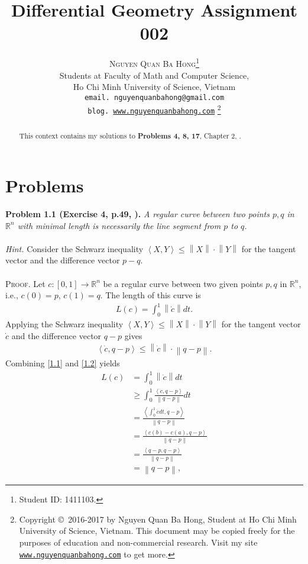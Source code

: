 \documentclass[a4paper]{article}
\title{\huge Differential Geometry Assignment 002}
\author{\textsc{Nguyen Quan Ba Hong}\footnote{Student ID: 1411103.}\\
{\small Students at Faculty of Math and Computer Science,}\\ 
{\small Ho Chi Minh University of Science, Vietnam} \\
{\small \texttt{email. nguyenquanbahong@gmail.com}}\\
{\small \texttt{blog. \url{www.nguyenquanbahong.com}} 
\footnote{Copyright \copyright\ 2016-2017 by Nguyen Quan Ba Hong, Student at Ho Chi Minh University of Science, Vietnam. This document may be copied freely for the purposes of education and non-commercial research. Visit my site \texttt{\url{www.nguyenquanbahong.com}} to get more.}}}
\numberwithin{equation}{section}
\begin{document}
\maketitle
\begin{abstract}
This context contains my solutions to \textbf{Problems 4, 8, 17}, Chapter 2, \cite{1}.
\end{abstract}
\newpage
\tableofcontents
\newpage
\section{Problems}
\textbf{Problem 1.1 (Exercise 4, p.49, \cite{1}).} \textit{A regular curve between two points $p,q$ in $\mathbb{R}^n$ with minimal length is necessarily the line segment from $p$ to $q$.}\\
\\
\textit{Hint.} Consider the Schwarz inequality $\left\langle {X,Y} \right\rangle  \le \left\| X \right\| \cdot \left\| Y \right\|$ for the tangent vector and the difference vector $p-q$.\\
\\
\textsc{Proof.} Let $c:\left[ {0,1} \right] \to {\mathbb{R}^n}$ be a regular curve between two given points $p,q$ in $\mathbb{R}^n$, i.e., $c\left(0\right)=p$, $c\left(1\right)=q$. The length of this curve is
\begin{align}
\label{1.1}
L\left( c \right) = \int_0^1 {\left\| {\dot c} \right\|dt} .
\end{align}
Applying the Schwarz inequality $\left\langle {X,Y} \right\rangle  \le \left\| X \right\| \cdot \left\| Y \right\|$ for the tangent vector ${\dot c}$ and the difference vector $q-p$ gives
\begin{align}
\label{1.2}
\left\langle {\dot c,q - p} \right\rangle  \le \left\| {\dot c} \right\| \cdot \left\| {q - p} \right\|.
\end{align}
Combining \eqref{1.1} and \eqref{1.2} yields
\begin{align}
L\left( c \right) &= \int_0^1 {\left\| {\dot c} \right\|dt} \\
&\ge \int_0^1 {\frac{{\left\langle {\dot c,q - p} \right\rangle }}{{\left\| {q - p} \right\|}}dt}\label{1.4} \\
& = \frac{{\left\langle {\int_0^1 {\dot cdt} ,q - p} \right\rangle }}{{\left\| {q - p} \right\|}}\label{1.5}\\
& = \frac{{\left\langle {c\left( b \right) - c\left( a \right),q - p} \right\rangle }}{{\left\| {q - p} \right\|}}\\
& = \frac{{\left\langle {q - p,q - p} \right\rangle }}{{\left\| {q - p} \right\|}}\\
& = \left\| {q - p} \right\|,
\end{align}
\end{document}
